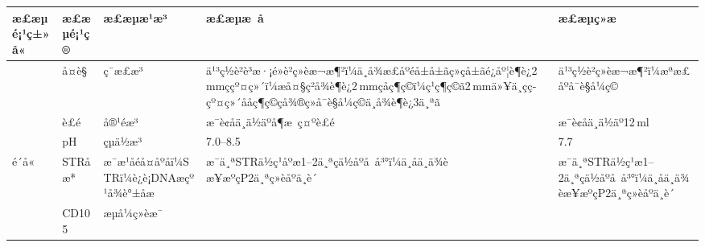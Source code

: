 \documentclass[UTF8,10pt,a4paper,fontset=fandol]{ctexart}
\newcommand{\fieldvalue}[1]{#1}
\begin{document}
\begin{tabularx}{\textwidth}{|>{\centering\arraybackslash}p{1.7cm}|>{\centering\arraybackslash}p{1.8cm}|>{\centering\arraybackslash}p{2.7cm}|X|X|}
\hline
æ£æµé¡¹ç±»å« & æ£æµé¡¹ç® & æ£æµæ¹æ³ & æ£æµæ å & æ£æµç»æ \\
\hline
\multirow{3}{*}{ä¸è¬æ£æ¥}
&
\fieldvalue{å¤è§}
&
\fieldvalue{ç¯æ£æ³}
&
\fieldvalue{ä¹³ç½è²è³æ·¡é»è²ç»èæ¬æ¶²ï¼ä¸å¾æ£åºéå±å±ãç»çå±ãé¿åº¦è¶è¿2\,mmççº¤ç»´ï¼æå¤§ç²å¾è¶è¿2\,mmçåç¶ç©ï¼ç¹ç¶ç©ã2\,mmä»¥ä¸çç­çº¤ç»´ååç¶ç©ç­å¾®ç»å¯è§å¼ç©ä¸å¾è¶è¿3ä¸ªã}
&
\fieldvalue{ä¹³ç½è²ç»èæ¬æ¶²ï¼æªæ£åºå¯è§å¼ç©}
\\
\cline{2-5}
&
\fieldvalue{è£é}
&
\fieldvalue{å®¹éæ³}
&
\fieldvalue{æ¯è¢åä¸ä½äºå¶æ ç¤ºè£é}
&
\fieldvalue{æ¯è¢åä¸ä½äº12\,ml}
\\
\cline{2-5}
&
\fieldvalue{pH}
&
\fieldvalue{çµä½æ³}
&
\fieldvalue{7.0--8.5}
&
\fieldvalue{7.7}
\\
\hline
é´å«
&
\fieldvalue{STRåæ*}
&
\fieldvalue{æ¯æ¹åéå¤åºåï¼STRï¼è¿è¡DNAæçº¹å¾è°±åæ}
&
\fieldvalue{æ¯ä¸ªSTRä½ç¹åºæ1--2ä¸ªç­ä½åºå å³°ï¼ä¸åä¸ä¾èæ¥æºçP2ä¸ªç»èåºä¸è´}
&
\fieldvalue{æ¯ä¸ªSTRä½ç¹æ1--2ä¸ªç­ä½åºå å³°ï¼ä¸åä¸ä¾èæ¥æºçP2ä¸ªç»èåºä¸è´}
\\
\hline
\multirow{7}{*}{é´å«ä¸çº¯åº¦}
&
\fieldvalue{CD105}
&
\fieldvalue{æµå¼ç»èæ¯}

\end{tabularx}
\end{document}
